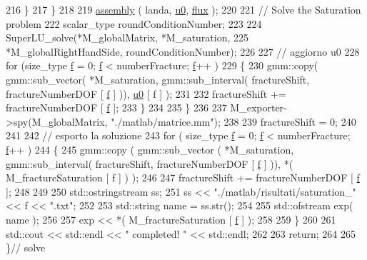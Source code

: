 \begin{DoxyCode}
216             \}
217         \}
218 
219         \hyperlink{classSaturationFractured_ad5271c4036ec9a4a7c58cddbb42515ec}{assembly} ( landa, \hyperlink{god__e_8m_ae060ce5868d35ef17bcb6e832da03be9}{u0}, \hyperlink{confronto_8m_a96d7a28b6a4428be15fc1017d19343fa}{flux} );
220 
221         \textcolor{comment}{// Solve the Saturation problem}
222         scalar\_type roundConditionNumber;
223 
224         SuperLU\_solve(*M\_globalMatrix, *M\_saturation,
225                       *M\_globalRightHandSide, roundConditionNumber);
226 
227         \textcolor{comment}{// aggiorno u0}
228         \textcolor{keywordflow}{for} (size\_type \hyperlink{god__e_8m_a68f477f9b30a6300d5af9b02eac82f35}{f} = 0; \hyperlink{god__e_8m_a68f477f9b30a6300d5af9b02eac82f35}{f} < numberFracture; \hyperlink{god__e_8m_a68f477f9b30a6300d5af9b02eac82f35}{f}++ )
229         \{
230             gmm::copy( gmm::sub\_vector( *M\_saturation, gmm::sub\_interval( fractureShift, fractureNumberDOF 
      [ \hyperlink{god__e_8m_a68f477f9b30a6300d5af9b02eac82f35}{f} ] )), \hyperlink{god__e_8m_ae060ce5868d35ef17bcb6e832da03be9}{u0} [ f ] );
231 
232             fractureShift += fractureNumberDOF [ \hyperlink{god__e_8m_a68f477f9b30a6300d5af9b02eac82f35}{f} ];
233         \}
234 
235     \}
236 
237     M\_exporter->spy(M\_globalMatrix, \textcolor{stringliteral}{"./matlab/matrice.mm"});
238 
239     fractureShift = 0;
240 
241 
242     \textcolor{comment}{// esporto la soluzione}
243     \textcolor{keywordflow}{for} ( size\_type \hyperlink{god__e_8m_a68f477f9b30a6300d5af9b02eac82f35}{f} = 0; \hyperlink{god__e_8m_a68f477f9b30a6300d5af9b02eac82f35}{f} < numberFracture; \hyperlink{god__e_8m_a68f477f9b30a6300d5af9b02eac82f35}{f}++ )
244     \{
245         gmm::copy ( gmm::sub\_vector ( *M\_saturation, gmm::sub\_interval( fractureShift, fractureNumberDOF [ 
      \hyperlink{god__e_8m_a68f477f9b30a6300d5af9b02eac82f35}{f} ] )), *( M\_fractureSaturation [ f ] ) );
246 
247         fractureShift += fractureNumberDOF [ \hyperlink{god__e_8m_a68f477f9b30a6300d5af9b02eac82f35}{f} ];
248 
249 
250         std::ostringstream ss;
251         ss << \textcolor{stringliteral}{"./matlab/risultati/saturation\_"} << f << \textcolor{stringliteral}{".txt"};
252 
253         std::string name = ss.str();
254 
255         std::ofstream exp( name );
256 
257         exp << *( M\_fractureSaturation [ \hyperlink{god__e_8m_a68f477f9b30a6300d5af9b02eac82f35}{f} ] );
258 
259     \}
260 
261     std::cout << std::endl << \textcolor{stringliteral}{" completed! "} << std::endl;
262 
263     \textcolor{keywordflow}{return};
264 
265 \}\textcolor{comment}{// solve}
\end{DoxyCode}


